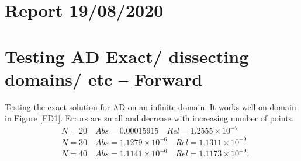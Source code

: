 \documentclass[11pt, a4paper]{article}
\theoremstyle{definition}
\begin{document}
	\section*{Report 19/08/2020}
	\section{Testing AD Exact/ dissecting domains/ etc -- Forward}
	Testing the exact solution for AD on an infinite domain. It works well on domain in Figure \ref{FD1}. Errors are small and decrease with increasing number of points.
	\begin{align*}
	&N = 20 \quad Abs = 0.00015915 \quad Rel = 1.2555 \times 10^{-7}\\
	&N = 30 \quad Abs = 1.1279 \times 10^{-6} \quad Rel = 1.1311 \times 10^{-9}\\
	&N = 40 \quad Abs = 1.1141 \times 10^{-6} \quad Rel = 1.1173 \times 10^{-9}.\\
	\end{align*}
	
\end{document}
